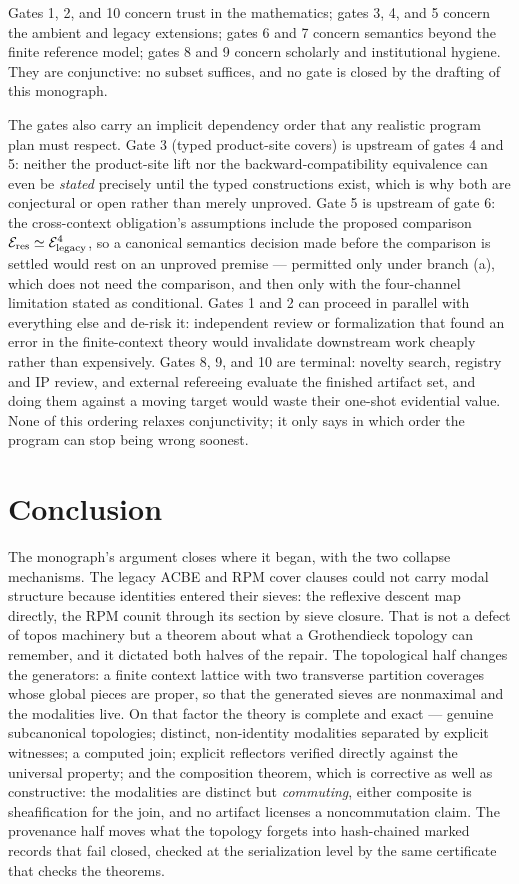Gates 1, 2, and 10 concern trust in the mathematics; gates 3, 4, and 5
concern the ambient and legacy extensions; gates 6 and 7 concern semantics
beyond the finite reference model; gates 8 and 9 concern scholarly and
institutional hygiene. They are conjunctive: no subset suffices, and no
gate is closed by the drafting of this monograph.

The gates also carry an implicit dependency order that any realistic
program plan must respect. Gate 3 (typed product-site covers) is
upstream of gates 4 and 5: neither the product-site lift nor the
backward-compatibility equivalence can even be \emph{stated} precisely
until the typed constructions exist, which is why both are conjectural
or open rather than merely unproved. Gate 5 is upstream of gate 6: the
cross-context obligation's assumptions include the proposed comparison
$\mathcal{E}_{\mathrm{res}} \simeq \mathcal{E}_{\mathrm{legacy}}^4$, so a canonical semantics decision made before
the comparison is settled would rest on an unproved premise ---
permitted only under branch (a), which does not need the comparison, and
then only with the four-channel limitation stated as conditional. Gates
1 and 2 can proceed in parallel with everything else and de-risk it:
independent review or formalization that found an error in the
finite-context theory would invalidate downstream work cheaply rather
than expensively. Gates 8, 9, and 10 are terminal: novelty search,
registry and IP review, and external refereeing evaluate the finished
artifact set, and doing them against a moving target would waste their
one-shot evidential value. None of this ordering relaxes conjunctivity;
it only says in which order the program can stop being wrong soonest.

\section{Conclusion}
\label{ch12:sec:conclusion}

The monograph's argument closes where it began, with the two collapse
mechanisms. The legacy ACBE and RPM cover clauses could not carry modal
structure because identities entered their sieves: the reflexive descent
map directly, the RPM counit through its section by sieve closure. That is
not a defect of topos machinery but a theorem about what a Grothendieck
topology can remember, and it dictated both halves of the repair. The
topological half changes the generators: a finite context lattice with two
transverse partition coverages whose global pieces are proper, so that the
generated sieves are nonmaximal and the modalities live. On that factor
the theory is complete and exact --- genuine subcanonical topologies;
distinct, non-identity modalities separated by explicit witnesses; a
computed join; explicit reflectors verified directly against the universal
property; and the composition theorem, which is corrective as well as
constructive: the modalities are distinct but \emph{commuting}, either
composite is sheafification for the join, and no artifact licenses a
noncommutation claim. The provenance half moves what the topology forgets
into hash-chained marked records that fail closed, checked at the
serialization level by the same certificate that checks the theorems.

